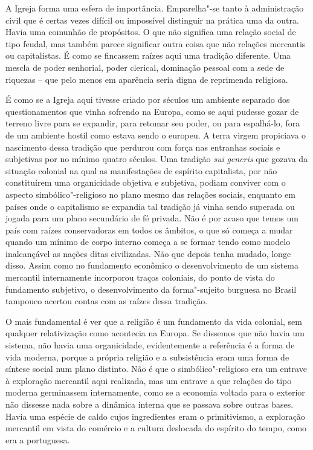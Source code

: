 A Igreja forma uma esfera de importância. Emparelha"-se tanto à
administração civil que é certas vezes difícil ou impossível distinguir
na prática uma da outra. Havia uma comunhão de propósitos. O que não
significa uma relação social de tipo feudal, mas também parece
significar outra coisa que não relações mercantis ou capitalistas. É
como se fincassem raízes aqui uma tradição diferente. Uma mescla de
poder senhorial, poder clerical, dominação pessoal com a sede de
riquezas -- que pelo menos em aparência seria digna de reprimenda
religiosa.

É como se a Igreja aqui tivesse criado por séculos um ambiente separado
dos questionamentos que vinha sofrendo na Europa, como se aqui pudesse
gozar de terreno livre para se expandir, para retomar seu poder, ou para
espalhá-lo, fora de um ambiente hostil como estava sendo o europeu. A
terra virgem propiciava o nascimento dessa tradição que perdurou com
força nas entranhas sociais e subjetivas por no mínimo quatro séculos.
Uma tradição \emph{sui} \emph{generis} que gozava da situação colonial
na qual as manifestações de espírito capitalista, por não constituírem
uma organicidade objetiva e subjetiva, podiam conviver com o aspecto
simbólico"-religioso no plano mesmo das relações sociais, enquanto em
países onde o capitalismo se expandia tal tradição já vinha sendo
superada ou jogada para um plano secundário de fé privada. Não é por
acaso que temos um país com raízes conservadoras em todos os âmbitos, o
que só começa a mudar quando um mínimo de corpo interno começa a se
formar tendo como modelo inalcançável as nações ditas civilizadas. Não
que depois tenha mudado, longe disso. Assim como no fundamento econômico
o desenvolvimento de um sistema mercantil internamente incorporou traços
coloniais, do ponto de vista do fundamento subjetivo, o desenvolvimento
da forma"-sujeito burguesa no Brasil tampouco acertou contas com as
raízes dessa tradição.

O mais fundamental é ver que a religião é um fundamento da vida
colonial, sem qualquer relativização como acontecia na Europa. Se
dissemos que não havia um sistema, não havia uma organicidade,
evidentemente a referência é a forma de vida moderna, porque a própria
religião e a subsistência eram uma forma de síntese social num plano
distinto. Não é que o simbólico"-religioso era um entrave à exploração
mercantil aqui realizada, mas um entrave a que relações do tipo moderna
germinassem internamente, como se a economia voltada para o exterior não
dissesse nada sobre a dinâmica interna que se passava sobre outras
bases. Havia uma espécie de caldo cujos ingredientes eram o
primitivismo, a exploração mercantil em vista do comércio e a cultura
deslocada do espírito do tempo, como era a portuguesa.

